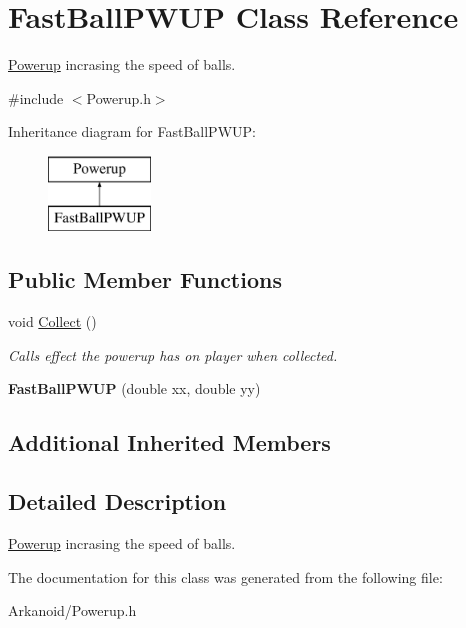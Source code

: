 \hypertarget{class_fast_ball_p_w_u_p}{}\section{Fast\+Ball\+P\+W\+UP Class Reference}
\label{class_fast_ball_p_w_u_p}


\hyperlink{class_powerup}{Powerup} incrasing the speed of balls.  




{\ttfamily \#include $<$Powerup.\+h$>$}

Inheritance diagram for Fast\+Ball\+P\+W\+UP\+:\begin{figure}[H]
\begin{center}
\leavevmode
\includegraphics[height=2.000000cm]{class_fast_ball_p_w_u_p}
\end{center}
\end{figure}
\subsection*{Public Member Functions}
\begin{DoxyCompactItemize}
\item 
\mbox{\label{class_fast_ball_p_w_u_p_a35493f4157c289174752a6b16f1b8fc2}} 
void \hyperlink{class_fast_ball_p_w_u_p_a35493f4157c289174752a6b16f1b8fc2}{Collect} ()
\begin{DoxyCompactList}\small\item\em Calls effect the powerup has on player when collected. \end{DoxyCompactList}\item 
\mbox{\label{class_fast_ball_p_w_u_p_acbb7e5b3a7febc34b7f4577971c6552c}} 
{\bfseries Fast\+Ball\+P\+W\+UP} (double xx, double yy)
\end{DoxyCompactItemize}
\subsection*{Additional Inherited Members}


\subsection{Detailed Description}
\hyperlink{class_powerup}{Powerup} incrasing the speed of balls. 

The documentation for this class was generated from the following file\+:\begin{DoxyCompactItemize}
\item 
Arkanoid/Powerup.\+h\end{DoxyCompactItemize}
